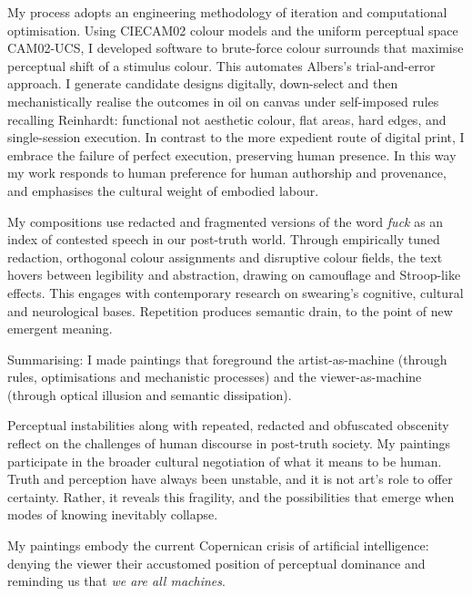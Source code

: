 \documentclass[12pt]{article}
\begin{document}
My process adopts an engineering methodology of iteration and
computational optimisation. Using CIECAM02 colour models and the
uniform perceptual space
CAM02-UCS\cite{Luo2001CIECAM02,CIE1592004,CIE1976,CIE1978Uniform,Luo2001CIEDE2000},
I developed software\cite{grant2025colourshift} to brute-force colour
surrounds that maximise perceptual shift of a stimulus colour. This
automates Albers’s trial-and-error approach\cite{albers}. I generate
candidate designs digitally, down-select and then mechanistically
realise the outcomes in oil on canvas under self-imposed rules
recalling Reinhardt\cite{artasart}: functional not aesthetic colour,
flat areas, hard edges, and single-session execution. In contrast to the more expedient route of digital print, I embrace the failure of perfect execution, preserving
human presence\cite{rosenberg1952american,bois1990painting}. In this way my
work responds to human preference for human authorship and
provenance\cite{benjamin1969art,horton2023bias,demmer2023does},
and emphasises the cultural weight of embodied
labour\cite{adorno1970aesthetic,sennett2008craftsman}.

My compositions use redacted and fragmented versions of the word
\emph{fuck} as an index of contested
speech\cite{atkins2006censoring,lukianoff2023cancelling} in our
post-truth world. Through empirically tuned redaction, orthogonal
colour assignments and disruptive colour fields, the text hovers
between legibility and abstraction, drawing on camouflage and
Stroop-like effects. This engages with contemporary research on
swearing’s cognitive, cultural and neurological
bases\cite{reiman2022swearfluency,jay2015taboo,pinker2017moral,bergen2018what}. Repetition
produces semantic
drain\cite{barthes1957mythologies,derrida1972dissemination}, to the
point of new emergent
meaning\cite{deleuze1968difference,baudrillard1981simulacra}.

Summarising: I made paintings that foreground the artist-as-machine
(through rules, optimisations and mechanistic processes) and the
viewer-as-machine (through optical illusion and semantic dissipation).

Perceptual instabilities along with repeated, redacted and obfuscated
obscenity reflect on the challenges of human discourse in post-truth
society. My paintings participate in the broader cultural negotiation
of what it means to be human. Truth and perception have always been
unstable, and it is not art's role to offer certainty. Rather, it
reveals this fragility, and the possibilities that emerge when modes
of knowing inevitably collapse.

My paintings embody the current Copernican crisis of artificial
intelligence: denying the viewer their accustomed position of
perceptual dominance and reminding us that \emph{we are all machines}.

\newpage


\end{document}
